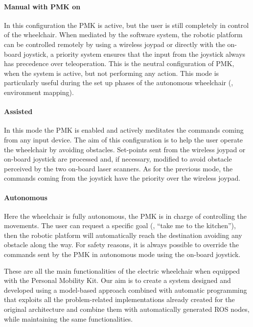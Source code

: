 \paragraph{Manual with PMK on} In this configuration the PMK is active, but the user is still completely in control of the wheelchair. When mediated by the software system, the robotic platform can be controlled remotely by using a wireless joypad or directly with the on-board joystick, a priority system ensures that the input from the joystick always has precedence over teleoperation. This is the neutral configuration of PMK, when the system is active, but not performing any action. This mode is particularly useful during the set up phases of the autonomous wheelchair (\eg, environment mapping).
\paragraph{Assisted} In this mode the PMK is enabled and actively meditates the commands coming from any input device. The aim of this configuration is to help the user operate the wheelchair by avoiding obstacles. Set-points sent from the wireless joypad or on-board joystick are processed and, if necessary, modified to avoid obstacle perceived by the two on-board laser scanners. As for the previous mode, the commands coming from the joystick have the priority over the wireless joypad.
\paragraph{Autonomous} Here the wheelchair is fully autonomous, the PMK is in charge of controlling the movements. The user can request a specific goal (\eg, ``take me to the kitchen''), then the robotic platform will automatically reach the destination avoiding any obstacle along the way. For safety reasons, it is always possible to override the commands sent by the PMK in autonomous mode using the on-board joystick.

\medskip
These are all the main functionalities of the electric wheelchair when equipped with the Personal Mobility Kit. Our aim is to create a system designed and developed using a model-based approach combined with automatic programming that exploits all the problem-related implementations already created for the original architecture and combine them with automatically generated ROS nodes, while maintaining the same functionalities.

